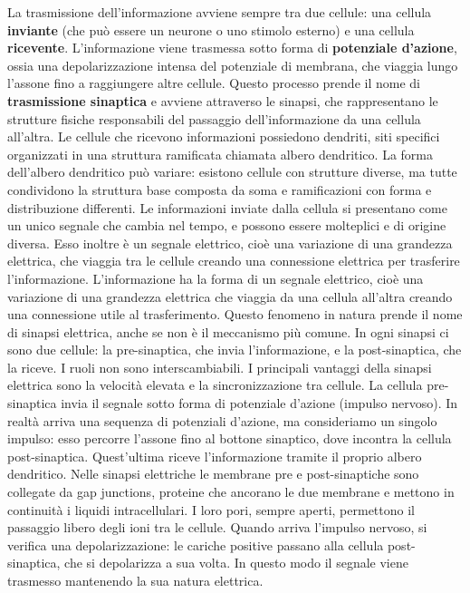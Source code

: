 La trasmissione dell’informazione avviene sempre tra due cellule: una cellula \textbf{inviante} (che può essere un neurone o uno stimolo esterno) e una cellula \textbf{ricevente}. L’informazione viene trasmessa sotto forma di \textbf{potenziale d’azione}, ossia una depolarizzazione intensa del potenziale di membrana, che viaggia lungo l’assone fino a raggiungere altre cellule. Questo processo prende il nome di \textbf{trasmissione sinaptica} e avviene attraverso le sinapsi, che rappresentano le strutture fisiche responsabili del passaggio dell’informazione da una cellula all’altra.
Le cellule che ricevono informazioni possiedono dendriti, siti specifici organizzati in una struttura ramificata chiamata albero dendritico. La forma dell’albero dendritico può variare: esistono cellule con strutture diverse, ma tutte condividono la struttura base composta da soma e ramificazioni con forma e distribuzione differenti. Le informazioni inviate dalla cellula si presentano come un unico segnale che cambia nel tempo, e possono essere molteplici e di origine diversa. Esso inoltre è un segnale elettrico, cioè una variazione di una grandezza elettrica, che viaggia tra le cellule creando una connessione elettrica per trasferire l’informazione. L’informazione ha la forma di un segnale elettrico, cioè una variazione di una grandezza elettrica che viaggia da una cellula all’altra creando una connessione utile al trasferimento. Questo fenomeno in natura prende il nome di sinapsi elettrica, anche se non è il meccanismo più comune. In ogni sinapsi ci sono due cellule: la pre-sinaptica, che invia l’informazione, e la post-sinaptica, che la riceve. I ruoli non sono interscambiabili. I principali vantaggi della sinapsi elettrica sono la velocità elevata e la sincronizzazione tra cellule.
La cellula pre-sinaptica invia il segnale sotto forma di potenziale d’azione (impulso nervoso). In realtà arriva una sequenza di potenziali d’azione, ma consideriamo un singolo impulso: esso percorre l’assone fino al bottone sinaptico, dove incontra la cellula post-sinaptica. Quest’ultima riceve l’informazione tramite il proprio albero dendritico. Nelle sinapsi elettriche le membrane pre e post-sinaptiche sono collegate da gap junctions, proteine che ancorano le due membrane e mettono in continuità i liquidi intracellulari. I loro pori, sempre aperti, permettono il passaggio libero degli ioni tra le cellule. Quando arriva l’impulso nervoso, si verifica una depolarizzazione: le cariche positive passano alla cellula post-sinaptica, che si depolarizza a sua volta. In questo modo il segnale viene trasmesso mantenendo la sua natura elettrica.

